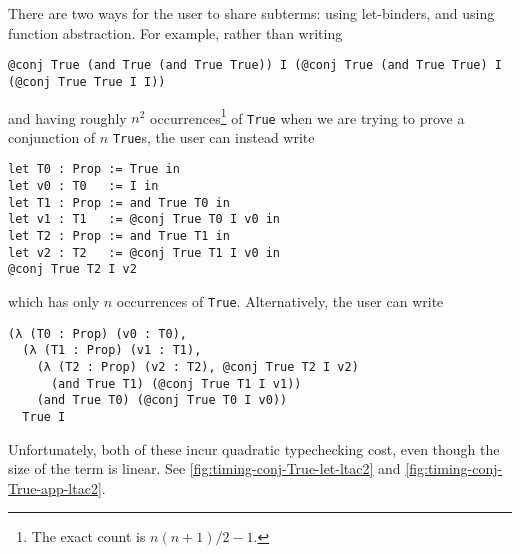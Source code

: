 There are two ways for the user to share subterms: using let-binders, and using function abstraction.
For example, rather than writing
\begin{verbatim}
@conj True (and True (and True True)) I (@conj True (and True True) I (@conj True True I I))
\end{verbatim}
and having roughly $n^2$ occurrences\footnote{The exact count is $n(n+1)/2 - 1$.} of \texttt{True} when we are trying to prove a conjunction of $n$ \texttt{True}s, the user can instead write
\begin{verbatim}
let T0 : Prop := True in
let v0 : T0   := I in
let T1 : Prop := and True T0 in
let v1 : T1   := @conj True T0 I v0 in
let T2 : Prop := and True T1 in
let v2 : T2   := @conj True T1 I v0 in
@conj True T2 I v2
\end{verbatim}
which has only $n$ occurrences of \texttt{True}.
Alternatively, the user can write
\begin{verbatim}
(λ (T0 : Prop) (v0 : T0),
  (λ (T1 : Prop) (v1 : T1),
    (λ (T2 : Prop) (v2 : T2), @conj True T2 I v2)
      (and True T1) (@conj True T1 I v1))
    (and True T0) (@conj True T0 I v0))
  True I
\end{verbatim}

Unfortunately, both of these incur quadratic typechecking cost, even though the size of the term is linear.
See \autoref{fig:timing-conj-True-let-ltac2} and \autoref{fig:timing-conj-True-app-ltac2}.

